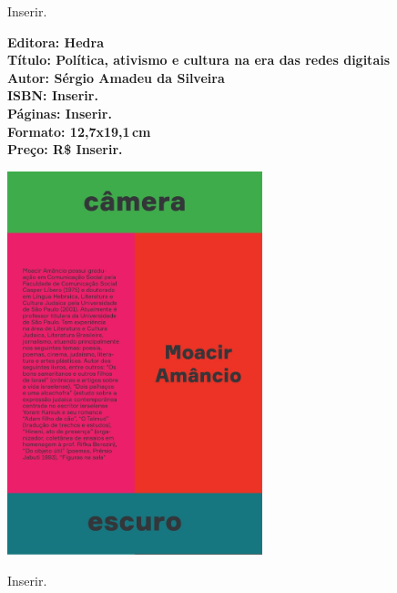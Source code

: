 \hspace*{-7cm}\hrulefill\hspace*{-7cm}

\medskip

\noindent{}Inserir.

\vfill

\noindent\begin{minipage}[c]{1\linewidth}
{\small\textbf{
\hspace*{-.1cm}Editora: Hedra\\
Título: Política, ativismo e cultura na era das redes digitais\\
Autor: Sérgio Amadeu da Silveira\\ 
ISBN: Inserir.\\
Páginas: Inserir.\\
Formato: 12,7x19,1\,cm\\
Preço: R\$ Inserir.\\
}}
\end{minipage}

\pagebreak

\begin{center}
\hspace*{.5cm}\includegraphics[width=74mm]{./CAPAS/camara.jpeg}
\end{center}

\hspace*{-7cm}\hrulefill\hspace*{-7cm}

\medskip

\noindent{}Inserir.

